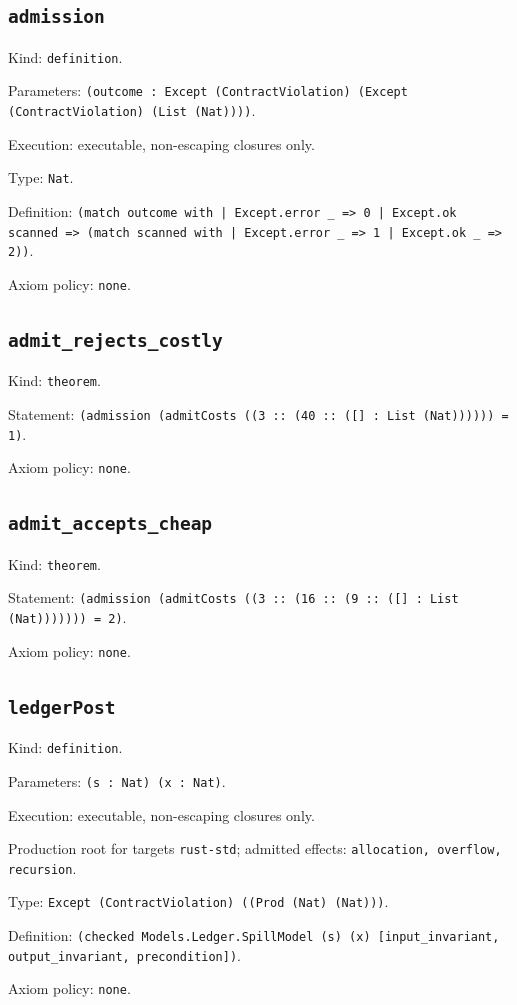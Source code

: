 \documentclass[11pt]{article}
\begin{document}
\subsection*{\texttt{admission}}
\noindent Kind: \texttt{definition}.\par
\noindent Parameters: \texttt{(outcome : Except (ContractViolation) (Except (ContractViolation) (List (Nat))))}.\par
\noindent Execution: executable, non-escaping closures only.\par
\noindent Type: \texttt{Nat}.\par
\noindent Definition: \texttt{(match outcome with | Except.error \_ => 0 | Except.ok scanned => (match scanned with | Except.error \_ => 1 | Except.ok \_ => 2))}.\par
\noindent Axiom policy: \texttt{none}.\par
\subsection*{\texttt{admit\_rejects\_costly}}
\noindent Kind: \texttt{theorem}.\par
\noindent Statement: \texttt{(admission (admitCosts ((3 :: (40 :: ([] : List (Nat)))))) = 1)}.\par
\noindent Axiom policy: \texttt{none}.\par
\subsection*{\texttt{admit\_accepts\_cheap}}
\noindent Kind: \texttt{theorem}.\par
\noindent Statement: \texttt{(admission (admitCosts ((3 :: (16 :: (9 :: ([] : List (Nat))))))) = 2)}.\par
\noindent Axiom policy: \texttt{none}.\par
\subsection*{\texttt{ledgerPost}}
\noindent Kind: \texttt{definition}.\par
\noindent Parameters: \texttt{(s : Nat) (x : Nat)}.\par
\noindent Execution: executable, non-escaping closures only.\par
\noindent Production root for targets \texttt{rust-std}; admitted effects: \texttt{allocation, overflow, recursion}.\par
\noindent Type: \texttt{Except (ContractViolation) ((Prod (Nat) (Nat)))}.\par
\noindent Definition: \texttt{(checked Models.Ledger.SpillModel (s) (x) [input\_invariant, output\_invariant, precondition])}.\par
\noindent Axiom policy: \texttt{none}.\par
\end{document}
